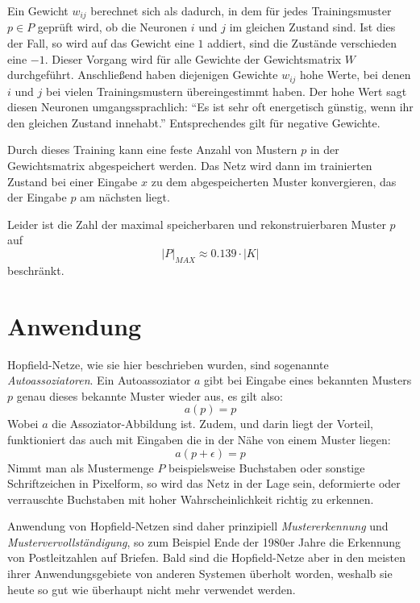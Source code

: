 Ein Gewicht $w_{ij}$ berechnet sich als dadurch, in dem für jedes Trainingsmuster $p \in P$ geprüft wird, ob die Neuronen $i$ und $j$ im gleichen Zustand sind. Ist dies der Fall, so wird auf das Gewicht eine $1$ addiert, sind die Zustände verschieden eine $-1$.
Dieser Vorgang wird für alle Gewichte der Gewichtsmatrix $W$ durchgeführt. Anschließend haben diejenigen Gewichte $w_{ij}$ hohe Werte, bei denen $i$ und $j$ bei vielen Trainingsmustern übereingestimmt haben.
Der hohe Wert sagt diesen Neuronen umgangssprachlich: "`Es ist sehr oft energetisch günstig, wenn ihr den gleichen Zustand innehabt."' Entsprechendes gilt für negative Gewichte.

Durch dieses Training kann eine feste Anzahl von Mustern $p$ in der Gewichtsmatrix abgespeichert werden. Das Netz wird dann im trainierten Zustand bei einer Eingabe $x$ zu dem abgespeicherten Muster konvergieren, das der Eingabe $p$ am nächsten liegt.

Leider ist die Zahl der maximal speicherbaren und rekonstruierbaren Muster $p$ auf
\[
	|P|_{MAX} \approx 0.139 \cdot |K|
\]
\noindent
beschränkt.




\section*{Anwendung}
Hopfield-Netze, wie sie hier beschrieben wurden, sind sogenannte \emph{Autoassoziatoren}. Ein Autoassoziator $a$ gibt bei Eingabe eines bekannten Musters $p$ genau dieses bekannte Muster wieder aus, es gilt also:
\[
	a(p) = p
\]
Wobei $a$ die Assoziator-Abbildung ist. Zudem, und darin liegt der Vorteil, funktioniert das auch mit Eingaben die in der Nähe von einem Muster liegen:
\[
	a(p + \epsilon) = p
\]
Nimmt man als Mustermenge $P$ beispielsweise Buchstaben oder sonstige Schriftzeichen in Pixelform, so wird das Netz in der Lage sein, deformierte oder verrauschte Buchstaben mit hoher Wahrscheinlichkeit richtig zu erkennen.

Anwendung von Hopfield-Netzen sind daher prinzipiell \emph{Mustererkennung} und \emph{Mustervervollständigung}, so zum Beispiel Ende der 1980er Jahre die Erkennung von Postleitzahlen auf Briefen. Bald sind die Hopfield-Netze aber in den meisten ihrer Anwendungsgebiete von anderen Systemen überholt worden, weshalb sie heute so gut wie überhaupt nicht mehr verwendet werden.



